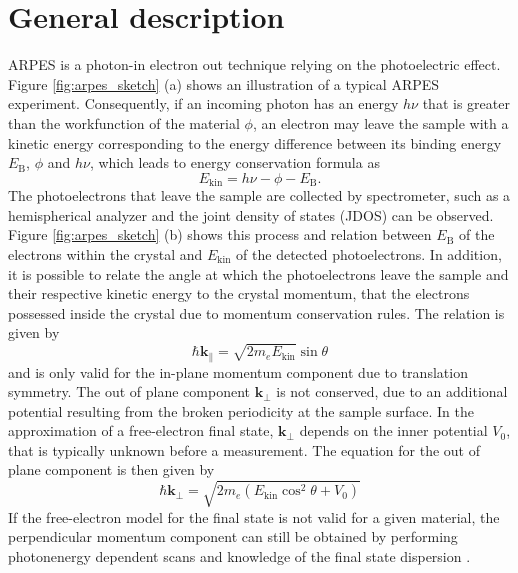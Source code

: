 \section{General description}

ARPES is a photon-in electron out technique relying on the photoelectric effect.
Figure \ref{fig:arpes_sketch} (a) shows an illustration of a typical ARPES experiment.
Consequently, if an incoming photon has an energy $h\nu$ that is greater than the workfunction of the material $\phi$, an electron may leave the sample with a kinetic energy corresponding to the energy difference between its binding energy $E_\text{B}$, $\phi$ and $h\nu$, which leads to energy conservation formula as
\begin{equation}
	E_\text{kin} = h\nu - \phi - E_\text{B}.
	\label{eq_e_cons}
\end{equation}
The photoelectrons that leave the sample are collected by spectrometer, such as a hemispherical analyzer and the joint density of states (JDOS) can be observed.
Figure \ref{fig:arpes_sketch} (b) shows this process and relation between $E_\text{B}$ of the electrons within the crystal and $E_\text{kin}$ of the detected photoelectrons.
In addition, it is possible to relate the angle at which the photoelectrons leave the sample and their respective kinetic energy to the crystal momentum, that the electrons possessed inside the crystal due to momentum conservation rules.
The relation is given by
\begin{equation}
	\hbar \mathbf{k}_\parallel = \sqrt{2m_eE_\text{kin}} \sin\theta
	\label{eq:mom}
\end{equation}
and is only valid for the in-plane momentum component due to translation symmetry.
The out of plane component $\mathbf{k}_\perp$ is not conserved, due to an additional potential resulting from the broken periodicity at the sample surface.
In the approximation of a free-electron final state, $\mathbf{k}_\perp$ depends on the inner potential $V_0$, that is typically unknown before a measurement.
The equation for the out of plane component is then given by
\begin{equation}
	\hbar \mathbf{k}_\perp = \sqrt{2m_e\left(E_\text{kin}\cos^2\theta+V_0\right)}
\end{equation}
If the free-electron model for the final state is not valid for a given material, the perpendicular momentum component can still be obtained by performing photonenergy dependent scans and knowledge of the final state dispersion \cite{strocov_intrinsic_2003}.
